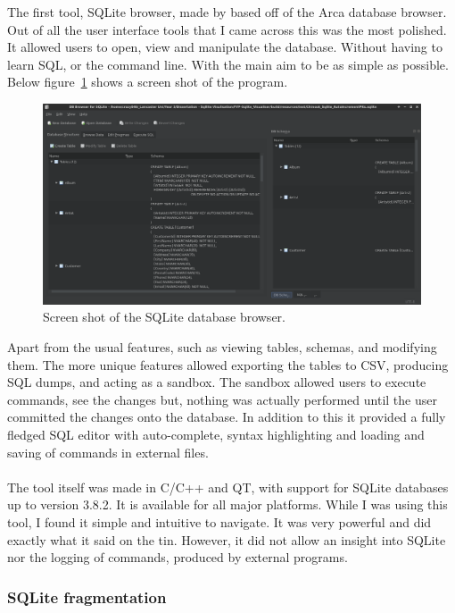 The first tool, SQLite browser, made by \cite{sqlitebrowser} based off of the Arca database browser. Out of all the user interface tools that I came across this was the most polished. It allowed users to open, view and manipulate the database. Without having to learn SQL, or the command line. With the main aim to be as simple as possible. Below figure~\ref{fig:db_browser_screen} shows a screen shot of the program.

\begin{figure}[H]
	\centering
	\includegraphics[scale=0.25]{images/db_browser.png}
	\caption{Screen shot of the SQLite database browser.}
	\label{fig:db_browser_screen}
\end{figure}

Apart from the usual features, such as viewing tables, schemas, and modifying them. The more unique features allowed exporting the tables to CSV, producing SQL dumps, and acting as a sandbox. The sandbox allowed users to execute commands, see the changes but, nothing was actually performed until the user committed the changes onto the database. In addition  to this it provided a fully fledged SQL editor with auto-complete, syntax highlighting and loading and saving of commands in external files.
\\\\
The tool itself was made in C/C++ and QT, with support for SQLite databases up to version 3.8.2. It is available for all major platforms. While I was using this tool, I found it simple and intuitive to navigate. It was very powerful and did exactly what it said on the tin. However, it did not allow an insight into SQLite nor the logging of commands, produced by external programs.

\subsubsection{SQLite fragmentation}
\label{subsubsec:sqlite_fragmentation}

